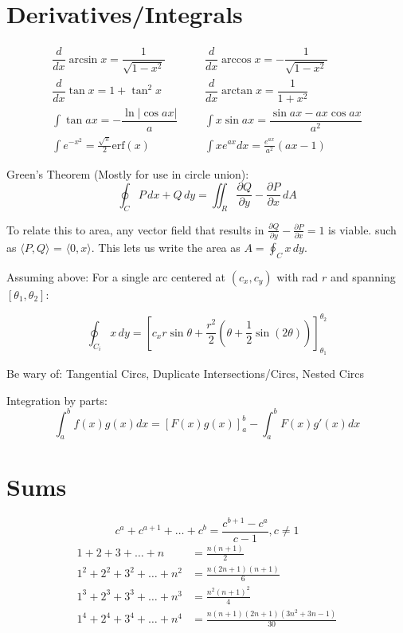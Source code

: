 \section{Derivatives/Integrals}
\begin{align*}
	\dfrac{d}{dx}\arcsin x = \dfrac{1}{\sqrt{1-x^2}} &&& \dfrac{d}{dx}\arccos x = -\dfrac{1}{\sqrt{1-x^2}} \\
	\dfrac{d}{dx}\tan x = 1+\tan^2 x &&& \dfrac{d}{dx}\arctan x = \dfrac{1}{1+x^2} \\
	\int\tan ax = -\dfrac{\ln|\cos ax|}{a} &&& \int x\sin ax = \dfrac{\sin ax-ax \cos ax}{a^2} \\
	\int e^{-x^2} = \frac{\sqrt \pi}{2} \text{erf}(x) &&& \int xe^{ax}dx = \frac{e^{ax}}{a^2}(ax-1)
\end{align*}

Green's Theorem (Mostly for use in circle union):
$$
\oint_C P\,dx+Q\,dy=\iint_R\frac{\partial Q}{\partial y}-\frac{\partial P}{\partial x}\,dA
$$

To relate this to area, any vector field that results in $\frac{\partial Q}{\partial y}-\frac{\partial P}{\partial x}=1$ is viable. such as  $\langle P, Q\rangle$ = $\langle 0, x\rangle$. This lets us write the area as $A=\oint_C x\,dy$.

Assuming above: For a single arc centered at $(c_x, c_y)$ with rad $r$ and spanning $[\theta_1, \theta_2]$:

$$\oint_{C_i} x\,dy = [c_xr\sin\theta+\frac{r^2}{2}(\theta+\frac{1}{2}\sin(2\theta))]_{\theta_1}^{\theta_2}$$

Be wary of: Tangential Circs, Duplicate Intersections/Circs, Nested Circs

Integration by parts:
\[\int_a^bf(x)g(x)dx = [F(x)g(x)]_a^b-\int_a^bF(x)g'(x)dx\]

\section{Sums}
\[ c^a + c^{a+1} + \dots + c^{b} = \frac{c^{b+1} - c^a}{c-1}, c \neq 1 \]
\begin{align*}
	1 + 2 + 3 + \dots + n &= \frac{n(n+1)}{2} \\
	1^2 + 2^2 + 3^2 + \dots + n^2 &= \frac{n(2n+1)(n+1)}{6} \\
	1^3 + 2^3 + 3^3 + \dots + n^3 &= \frac{n^2(n+1)^2}{4} \\
	1^4 + 2^4 + 3^4 + \dots + n^4 &= \frac{n(n+1)(2n+1)(3n^2 + 3n - 1)}{30} \\
\end{align*}

